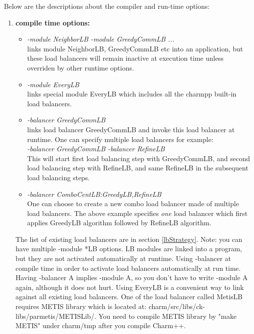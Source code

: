 Below are the descriptions about the compiler and run-time options:

\begin{enumerate}
\item {\bf compile time options:}

\begin{itemize}
\item {\em -module NeighborLB -module GreedyCommLB ...}  \\
  links module NeighborLB, GreedyCommLB etc into an application, but these 
load balancers will remain inactive at execution time unless overriden by 
other runtime options.
\item {\em -module EveryLB} \\
  links special module EveryLB which includes all the charmpp{} built-in load balancers.
\item {\em -balancer GreedyCommLB} \\
  links load balancer GreedyCommLB and invoke this load balancer at runtime. One can specify multiple load balancers for example: \\
   {\em -balancer GreedyCommLB -balancer RefineLB}   \\
   This will start first load balancing step with GreedyCommLB, and second load balancing step with RefineLB, and same RefineLB in the subsequent load balancing steps.
\item {\em -balancer ComboCentLB:GreedyLB,RefineLB}  \\
   One can choose to create a new combo load balancer made of multiple load balancers. The above example specifies {\em one} load balancer which first applies GreedyLB algorithm followed by RefineLB algorithm.
\end{itemize}

The list of existing load balancers are in section \ref{lbStrategy}.
Note: you can have multiple -module *LB options. LB modules are
linked into a program, but they are not activated automatically at runtime.
Using -balancer at compile time in order to activate load balancers automatically at run time. 
Having -balancer A implies -module A, so you don't have to write -module A again, although it does not hurt.
Using EveryLB is a convenient way to link against all existing load balancers. 
One of the load balancer called MetisLB requires METIS library 
which is located at: charm/src/libs/ck-libs/parmetis/METISLib/. 
You need to compile METIS library by "make METIS" under charm/tmp after you
compile Charm++.


\end{enumerate}
